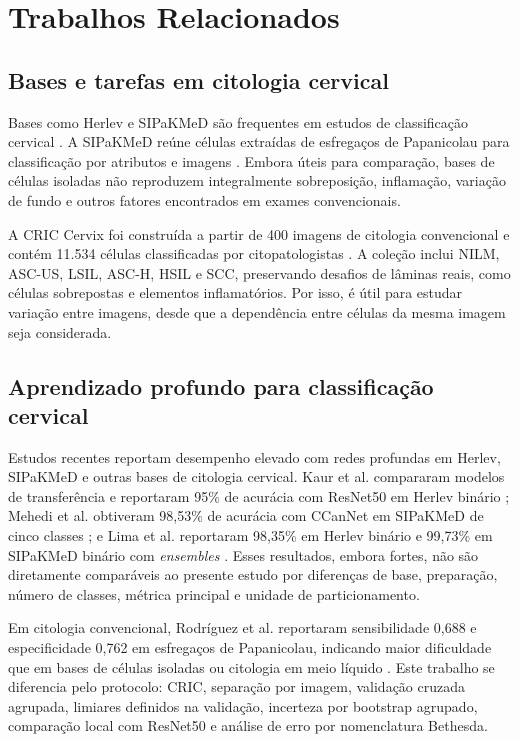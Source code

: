 \section{Trabalhos Relacionados}

\subsection{Bases e tarefas em citologia cervical}

Bases como Herlev e SIPaKMeD são frequentes em estudos de classificação
cervical \cite{jiang2023systematic,fang2024systematic}. A SIPaKMeD reúne
células extraídas de esfregaços de Papanicolau para classificação por atributos
e imagens \cite{plissiti2018sipakmed}. Embora úteis para comparação, bases de
células isoladas não reproduzem integralmente sobreposição, inflamação,
variação de fundo e outros fatores encontrados em exames convencionais.

A CRIC Cervix foi construída a partir de 400 imagens de citologia convencional
e contém 11.534 células classificadas por citopatologistas
\cite{rezende2021cric}. A coleção inclui NILM, ASC-US, LSIL, ASC-H, HSIL e
SCC, preservando desafios de lâminas reais, como células sobrepostas e
elementos inflamatórios. Por isso, é útil para estudar variação entre imagens,
desde que a dependência entre células da mesma imagem seja considerada.

\subsection{Aprendizado profundo para classificação cervical}

Estudos recentes reportam desempenho elevado com redes profundas em Herlev,
SIPaKMeD e outras bases de citologia cervical. Kaur et al. compararam modelos
de transferência e reportaram 95\% de acurácia com ResNet50 em Herlev binário
\cite{kaur2025comparison}; Mehedi et al. obtiveram 98,53\% de acurácia com
CCanNet em SIPaKMeD de cinco classes \cite{mehedi2024lightweight}; e Lima et
al. reportaram 98,35\% em Herlev binário e 99,73\% em SIPaKMeD binário com
\emph{ensembles} \cite{lima2025ensemble}. Esses resultados, embora fortes, não
são diretamente comparáveis ao presente estudo por diferenças de base,
preparação, número de classes, métrica principal e unidade de particionamento.

Em citologia convencional, Rodríguez et al. reportaram sensibilidade 0,688 e
especificidade 0,762 em esfregaços de Papanicolau, indicando maior dificuldade
que em bases de células isoladas ou citologia em meio líquido
\cite{rodriguez2024automated}. Este trabalho se diferencia pelo protocolo:
CRIC, separação por imagem, validação cruzada agrupada, limiares definidos na
validação, incerteza por bootstrap agrupado, comparação local com ResNet50 e
análise de erro por nomenclatura Bethesda.
